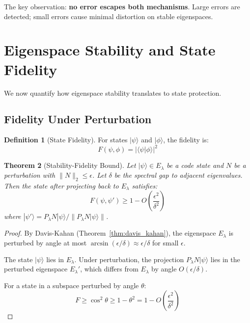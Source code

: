 \documentclass[11pt,a4paper]{article}
\newtheorem{theorem}{Theorem}[section]
\theoremstyle{definition}
\newtheorem{definition}[theorem]{Definition}
\newcommand{\ket}[1]{|#1\rangle}
\newcommand{\braket}[2]{\langle#1|#2\rangle}
\begin{document}
The key observation: \textbf{no error escapes both mechanisms}. Large errors are detected; small errors cause minimal distortion on stable eigenspaces.

\section{Eigenspace Stability and State Fidelity}
\label{sec:stability}

We now quantify how eigenspace stability translates to state protection.

\subsection{Fidelity Under Perturbation}

\begin{definition}[State Fidelity]
For states $\ket{\psi}$ and $\ket{\phi}$, the fidelity is:
\begin{equation}
    F(\psi, \phi) = |\braket{\psi}{\phi}|^2
\end{equation}
\end{definition}

\begin{theorem}[Stability-Fidelity Bound]
\label{thm:stability_fidelity}
Let $\ket{\psi} \in E_\lambda$ be a code state and $N$ be a perturbation with $\|N\|_2 \leq \epsilon$. Let $\delta$ be the spectral gap to adjacent eigenvalues. Then the state after projecting back to $E_\lambda$ satisfies:
\begin{equation}
    F(\psi, \psi') \geq 1 - O\left(\frac{\epsilon^2}{\delta^2}\right)
\end{equation}
where $\ket{\psi'} = P_\lambda N\ket{\psi} / \|P_\lambda N\ket{\psi}\|$.
\end{theorem}

\begin{proof}
By Davis-Kahan (Theorem~\ref{thm:davis_kahan}), the eigenspace $E_\lambda$ is perturbed by angle at most $\arcsin(\epsilon/\delta) \approx \epsilon/\delta$ for small $\epsilon$.

The state $\ket{\psi}$ lies in $E_\lambda$. Under perturbation, the projection $P_\lambda N\ket{\psi}$ lies in the perturbed eigenspace $E_\lambda'$, which differs from $E_\lambda$ by angle $O(\epsilon/\delta)$.

For a state in a subspace perturbed by angle $\theta$:
\begin{equation}
    F \geq \cos^2 \theta \geq 1 - \theta^2 = 1 - O\left(\frac{\epsilon^2}{\delta^2}\right)
\end{equation}
\end{proof}
\end{document}
